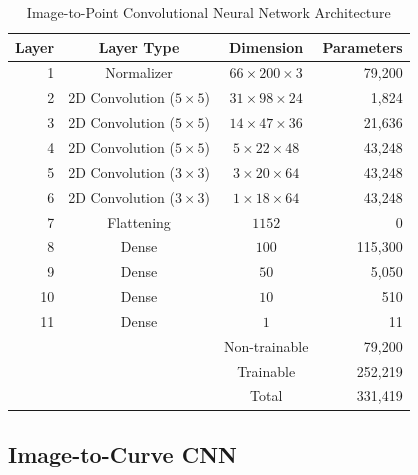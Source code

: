 \documentclass[conference]{IEEEtran}
\begin{document}
\begin{table}[tbp]
	\centering
	\caption{Image-to-Point Convolutional Neural Network Architecture}
	\begin{tabular}{|r|c|c|r|}
	\multicolumn{1}{c}{\bfseries Layer} & \multicolumn{1}{c}{\bfseries Layer Type} & \multicolumn{1}{c}{\bfseries Dimension} & \multicolumn{1}{c}{\bfseries Parameters} \\ \hline
	1 & Normalizer & $66 \times 200 \times 3$ & 79,200 \\
	2 & 2D Convolution ($5\times5$)& $31 \times 98 \times 24$ & 1,824 \\
	3 & 2D Convolution ($5\times5$)& $14 \times 47 \times 36$ & 21,636 \\
	4 & 2D Convolution ($5\times5$)& $5 \times 22 \times 48$ & 43,248 \\
	5 & 2D Convolution ($3\times3$)& $3 \times 20 \times 64$ & 43,248 \\
	6 & 2D Convolution ($3\times3$)& $1 \times 18 \times 64$ & 43,248 \\
	7 & Flattening & $1152$ & 0 \\
	8 & Dense & $100$ & 115,300 \\
	9 & Dense & $50$ & 5,050 \\
	10 & Dense & $10$ & 510 \\
	11 & Dense & $1$ & 11 \\ \hline
	\multicolumn{2}{c|}{} & Non-trainable & 79,200 \\
	\multicolumn{2}{c|}{} & Trainable & 252,219 \\ \cline{3-4}
	\multicolumn{2}{c|}{} & Total & 331,419 \\ \cline{3-4}
	\end{tabular}
	\label{tab:i2p-arch}
\end{table}

\subsection{Image-to-Curve CNN}
\end{document}
